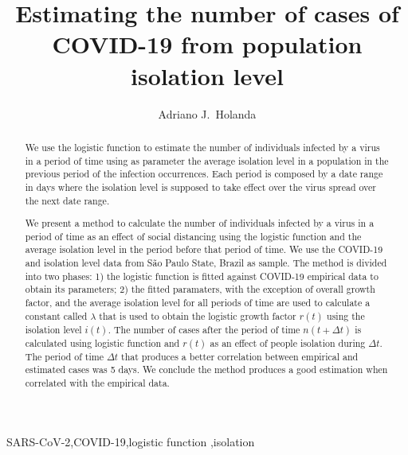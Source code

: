 \documentclass[review]{elsarticle}
\begin{document}
\begin{frontmatter}

\title{Estimating the number of cases of {COVID-19} from population isolation level}

\author[mymainaddress,mysecondaryaddress]{Adriano J.\ Holanda}

\address[mymainaddress]{Department of Computing and Mathematics - Faculty of Philosophy, Science and Letters at Ribeirão Preto - University of São Paulo, Ribeirão Preto, São Paulo, Brazil}
\address[mysecondaryaddress]{Faculty ``Dr.\ Francisco Maeda'', Ituverava, São Paulo, Brazil}


\begin{abstract}
We use the logistic function to estimate the number 
of individuals infected by a virus in a period of time
using as parameter the average isolation level in a population
in the previous period of the infection occurrences.
Each period is composed by a date range in days 
where the isolation level is supposed to take
effect over the virus spread over the next 
date range.

We present a method to calculate the number of individuals 
infected by a virus in a period of time as 
an effect of social distancing
using the logistic function and the average isolation level 
in the period before that period of time. 
We use the COVID-19 and isolation level data 
from São Paulo State, Brazil as sample.  
The method is divided into two phases: 
1) the logistic function is fitted against COVID-19 
empirical data to obtain its parameters; 
2) the fitted paramaters, 
with the exception of overall growth factor,
 and the average isolation level for all periods of time 
are used to calculate a constant called $\lambda$ 
that is used to obtain the logistic growth factor 
$r(t)$ using the isolation level $i(t)$.
 The number of cases after
the period of time $n(t+\Delta t)$ is calculated using 
logistic function and $r(t)$ as an effect
of people isolation during $\Delta t$. 
The period of time $\Delta t$ that produces a 
better correlation between empirical and estimated cases 
was 5 days. We conclude the method produces a good 
estimation when correlated with the empirical data.
\end{abstract}

\begin{keyword}
SARS-CoV-2\sep COVID-19\sep logistic function \sep isolation
\end{keyword}

\end{frontmatter}
\end{document}
